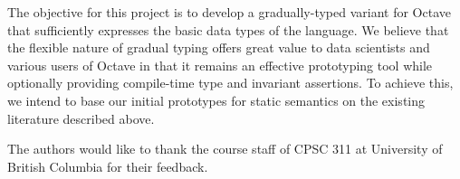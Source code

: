 The objective for this project is to develop a gradually-typed variant for Octave that sufficiently expresses the basic data types of the language. We believe that the flexible nature of gradual typing offers great value to data scientists and various users of Octave in that it remains an effective prototyping tool while optionally providing compile-time type and invariant assertions. To achieve this, we intend to base our initial prototypes for static semantics on the existing literature described above.

\appendix

\begin{acks}
    The authors would like to thank the course staff of CPSC 311 at University
    of British Columbia for their feedback.
\end{acks}
